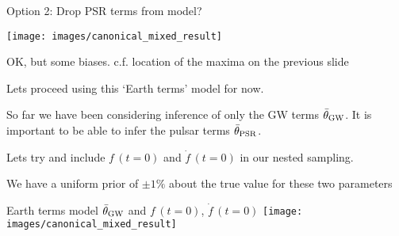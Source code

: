 \documentclass[10pt]{beamer}
\begin{document}
\begin{frame}{Option 2: Drop PSR terms from model?}
	
	
	\texttt{[image: images/canonical\_mixed\_result]}
	
	OK, but some biases. c.f. location of the maxima on the previous slide
\end{frame}



\begin{frame}{}
	
	Lets proceed using this `Earth terms' model for now. 
	
	
   So far we have been considering inference of only the GW terms $\bar{\theta}_{\rm GW}$. It is important to be able to infer the pulsar terms $\bar{\theta}_{\rm PSR}$.
   
   
   Lets try and include $f \, (t=0)$ and $\dot{f} \, (t=0)$ in our nested sampling.
   
   We have a uniform prior of $\pm 1 \%$ about the true value for these two parameters 
	
	
	

	

\end{frame}

\begin{frame}{Earth terms model $\bar{\theta}_{\rm GW}$ and $f \, (t=0)$, $\dot{f} \, (t=0)$}
	\texttt{[image: images/canonical\_mixed\_result]}
\end{frame}





	
\end{document}
